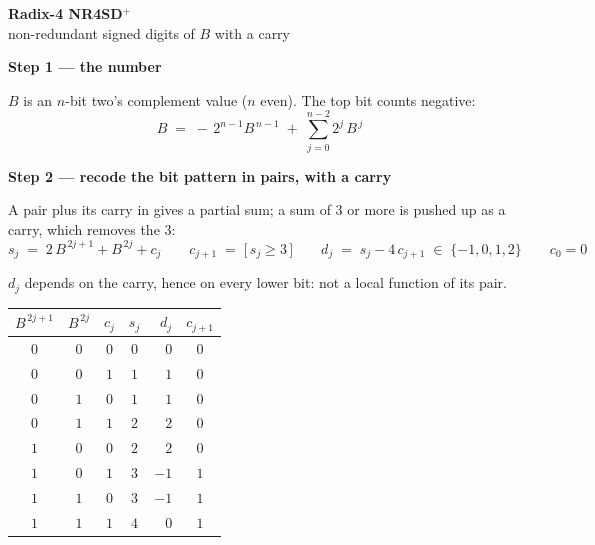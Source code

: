 \documentclass[fleqn]{article}
\begin{document}
\begin{center}
{\LARGE \textbf{Radix-4 NR4SD$^{+}$}}\\[4pt]
{\large non-redundant signed digits of $B$ with a carry}
\end{center}

\vspace{3em}

\noindent\textbf{Step 1 --- the number}

\noindent $B$ is an $n$-bit two's complement value ($n$ even). The top bit counts negative:
\[
B \;=\; -\,2^{n-1} B^{\,n-1} \;+\; \sum_{j=0}^{n-2} 2^{j} \, B^{\,j}
\]

\vspace{0.5em}

\noindent\textbf{Step 2 --- recode the bit pattern in pairs, with a carry}

\noindent A pair plus its carry in gives a partial sum; a sum of $3$ or more is pushed up
as a carry, which removes the $3$:
\[
s_j \;=\; 2 \, B^{\,2j+1} + B^{\,2j} + c_j
\qquad
c_{j+1} \;=\; \bigl[\, s_j \geq 3 \,\bigr]
\qquad
d_j \;=\; s_j - 4 \, c_{j+1} \;\in\; \{-1, 0, 1, 2\}
\qquad
c_0 = 0
\]

\noindent $d_j$ depends on the carry, hence on every lower bit: not a local function of its pair.

\vspace{0.5em}

\begin{center}
\renewcommand{\arraystretch}{1.35}
\begin{tabular}{c c c | c | r | c}
$B^{\,2j+1}$ & $B^{\,2j}$ & $c_j$ & $s_j$ & $d_j$ & $c_{j+1}$ \\
\hline
$0$ & $0$ & $0$ & $0$ & $0$  & $0$ \\
$0$ & $0$ & $1$ & $1$ & $1$  & $0$ \\
$0$ & $1$ & $0$ & $1$ & $1$  & $0$ \\
$0$ & $1$ & $1$ & $2$ & $2$  & $0$ \\
$1$ & $0$ & $0$ & $2$ & $2$  & $0$ \\
$1$ & $0$ & $1$ & $3$ & $-1$ & $1$ \\
$1$ & $1$ & $0$ & $3$ & $-1$ & $1$ \\
$1$ & $1$ & $1$ & $4$ & $0$  & $1$ \\
\end{tabular}
\end{center}

\vspace{0.5em}
\end{document}
